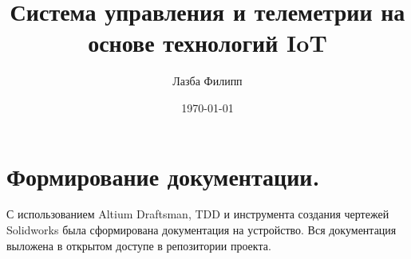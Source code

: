 \documentclass[a4paper,14pt]{article}
\author{Лазба Филипп}
\title{Система управления и телеметрии на основе технологий IoT}
\date{\today}
\begin{document}
	
	
	\tableofcontents{}
	
	
	
	
	
	
	\section{Формирование документации.} \label{sect:project-docs}
	
	С использованием Altium Draftsman, TDD и инструмента создания чертежей Solidworks была сформирована документация на устройство. Вся документация выложена в открытом доступе в репозитории проекта. 
	
	
	
	
		
	
	
	
\end{document}
